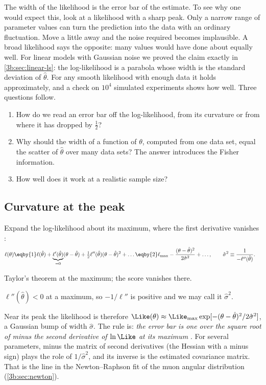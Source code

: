 The width of the likelihood is the error bar of the estimate. To see why
one would expect this, look at a likelihood with a sharp peak. Only a
narrow range of parameter values can turn the prediction into the data
with an ordinary fluctuation. Move a little away and the noise required
becomes implausible. A broad likelihood says the opposite: many values
would have done about equally well. For linear models with Gaussian noise
we proved the claim exactly in \cref{3b:sec:linear-ls}: the log-likelihood
is a parabola whose width is the standard deviation of $\hat\theta$. For any
smooth likelihood with enough data it holds approximately, and a check on
$10^4$ simulated experiments shows how well. Three questions follow.
\begin{enumerate}[label=\arabic*.]
  \item How do we read an error bar off the log-likelihood, from its
        curvature or from where it has dropped by $\tfrac12$?
  \item Why should the width of a function of $\theta$, computed from one
        data set, equal the scatter of $\hat\theta$ over many data sets? The
        answer introduces the Fisher information.
  \item How well does it work at a realistic sample size?
\end{enumerate}

\subsection{Curvature at the peak}
\label{3b:sec:curv-peak}

Expand the log-likelihood about its maximum, where the first derivative
vanishes :
\begin{align}
  \ell(\theta)
  &\eqby{1}\ell(\hat\theta)+\underbrace{\ell'(\hat\theta)}_{=0}(\theta-\hat\theta)
   +\tfrac12\ell''(\hat\theta)(\theta-\hat\theta)^2+\dots
  \eqby{2}\ell_{\max}-\frac{(\theta-\hat\theta)^2}{2\hat\sigma^2}+\dots,
  \qquad
  \hat\sigma^2\equiv\frac{1}{-\ell''(\hat\theta)} .
  \label{3b:eq:curvature}
\end{align}
\begin{explain}
  \item Taylor's theorem at the maximum; the score vanishes there.
  \item $\ell''(\hat\theta)<0$ at a maximum, so $-1/\ell''$ is positive and
        we may call it $\hat\sigma^2$.
\end{explain}
Near its peak the likelihood is therefore
$\Like(\theta)\approx\Like_{\max}\exp[-(\theta-\hat\theta)^2/2\hat\sigma^2]$,
a Gaussian bump of width $\hat\sigma$. The rule is: \emph{the error bar is
one over the square root of minus the second derivative of $\ln\Like$ at its
maximum} . For several parameters, minus the matrix of
second derivatives (the Hessian with a minus sign) plays the role of
$1/\hat\sigma^2$, and its inverse is the estimated covariance matrix. That
is the line  in the Newton--Raphson fit of
the muon angular distribution (\cref{3b:sec:newton}).

